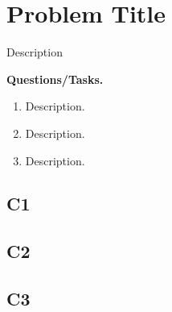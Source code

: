 	
	\section{Problem Title}
	Description 
	
	\textbf{Questions/Tasks.}
	\begin{enumerate}[label=\textbf{\alph*)}]
		\item[(C1)] Description.
		\item[(C2)] Description.
		\item[(C3)] Description.
	\end{enumerate}
	
	\subsection*{C1}
	
	\subsection*{C2}
	
	\subsection*{C3}
	

